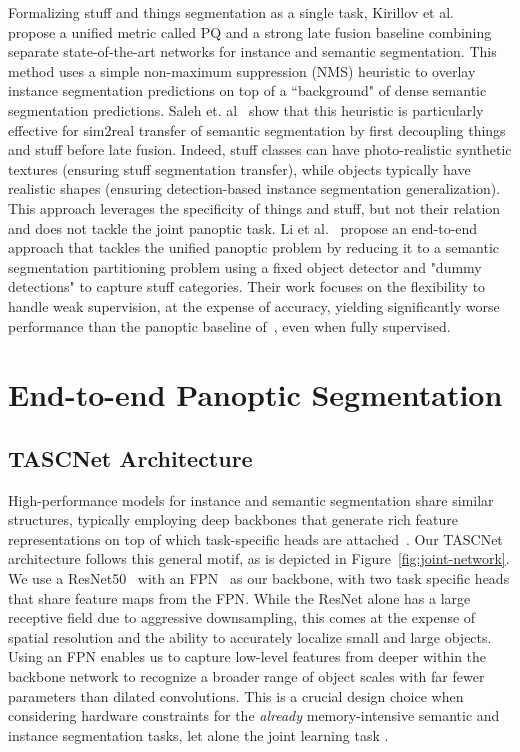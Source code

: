 \documentclass[10pt,twocolumn]{article}
\begin{document}
Formalizing stuff and things segmentation as a single task, Kirillov et al.~\cite{kirillov2018panoptic} propose a unified metric called \ac{PQ} and a strong late fusion baseline combining separate state-of-the-art networks for instance and semantic segmentation. This method uses a simple non-maximum suppression (NMS) heuristic to overlay instance segmentation predictions on top of a ``background" of dense semantic segmentation predictions.
Saleh et. al~\cite{saleh2018effective} show that this heuristic is particularly effective for sim2real transfer of semantic segmentation by first decoupling things and stuff before late fusion. Indeed, stuff classes can have photo-realistic synthetic textures (ensuring stuff segmentation transfer), while objects typically have realistic shapes (ensuring detection-based instance segmentation generalization). This approach leverages the specificity of things and stuff, but not their relation and does not tackle the joint panoptic task.
Li et al.~\cite{Li_2018_ECCV} propose an end-to-end approach that tackles the unified panoptic problem by reducing it to a semantic segmentation partitioning problem using a fixed object detector and "dummy detections" to capture stuff categories.
Their work focuses on the flexibility to handle weak supervision, at the expense of accuracy, yielding significantly worse performance than the panoptic baseline of~\cite{kirillov2018panoptic}, even when fully supervised.








 
\section{End-to-end Panoptic Segmentation\label{sec:method}}

\subsection{TASCNet Architecture}
High-performance models for instance and semantic segmentation share similar structures, typically employing deep backbones that generate rich feature representations on top of which task-specific heads are attached~\cite{deeplabv3plus2018}\cite{he2017mask}. Our TASCNet architecture follows this general motif, as is depicted in Figure~\ref{fig:joint-network}. We use a ResNet50~\cite{he2016resnet} with an \ac{FPN}~\cite{lin2017feature} as our backbone, with two task specific heads that share feature maps from the \ac{FPN}. While the ResNet alone has a large receptive field due to aggressive downsampling, this comes at the expense of spatial resolution and the ability to accurately localize small and large objects. Using an \ac{FPN} enables us to capture low-level features from deeper within the backbone network to recognize a broader range of object scales with far fewer parameters than dilated convolutions. This is a crucial design choice when considering hardware constraints for the \textit{already} memory-intensive semantic and instance segmentation tasks, let alone the joint learning task \cite{lin2017feature}.
\end{document}
